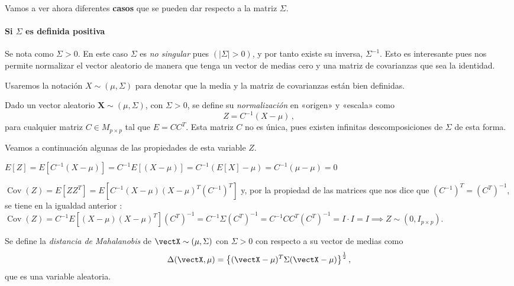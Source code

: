 Vamos a ver ahora diferentes \textbf{casos} que se pueden dar respecto a la matriz $\Sigma$.

\paragraph{Si $\Sigma$ es definida positiva} Se nota como $\Sigma > 0$. En este caso $\Sigma$ es \emph{no singular} pues $(|\Sigma| > 0)$, y por tanto existe su inversa, $\Sigma^{-1}$. Esto es interesante pues nos permite normalizar el vector aleatorio de manera que tenga un vector de medias cero y una matriz de covarianzas que sea la identidad.

\begin{nota}
  Usaremos la notación $X\sim(\mu,\Sigma)$ para denotar que la media y la matriz de covarianzas están bien definidas.
\end{nota}

\begin{ndef}[Normalización]
    Dado un vector aleatorio $\boldsymbol X\sim(\mu,\Sigma)$, con $\Sigma>0$, se define su \emph{normalización} en «origen» y «escala» como
    \[
  Z = C^{-1}(X - \mu)\,,
\]
para cualquier matriz $C\in M_{p\times p}$ tal que $E = CC^T$. Esta matriz $C$ no es única, pues existen infinitas descomposiciones de $\Sigma$ de esta forma.

  \end{ndef}

Veamos a continuación algunas de las propiedades de esta variable $Z$.
  \begin{nlist}
    \item
  $
  E[Z] = E[C^{-1}(X-\mu)] = C^{-1}E[(X-\mu)] = C^{-1}(E[X] - \mu) = C^{-1}(\mu - \mu ) = 0
  $

\item $\operatorname{Cov}(Z) = E[ZZ ^T] = E[C^{-1}(X-\mu)(X-\mu)^T(C^{-1})^T]$ y, por la propiedad de las matrices que nos dice que $(C^{-1})^T = (C^T)^{-1}$, se tiene en la igualdad anterior : $\operatorname{Cov}(Z) = C^{-1}E[(X-\mu)(X-\mu)^T](C^T)^{-1} = C^{-1} \Sigma (C^T)^{-1} = C^{-1}CC^T(C^T)^{-1} = I \cdot I = I \implies Z \sim (0, I_{p\times p}).$

  \end{nlist}

  \begin{ndef}
    Se define la \emph{distancia de Mahalanobis} de $\vectX\sim(\mu,\Sigma)$ con $\Sigma > 0$ con respecto a su vector de medias como
    \[
    \Delta(\vectX,\mu) = \left\{ (\vectX-\mu)^T \Sigma (\vectX-\mu) \right\} ^{\frac{1}{2}},
    \]
    que es una variable aleatoria.
  \end{ndef}

